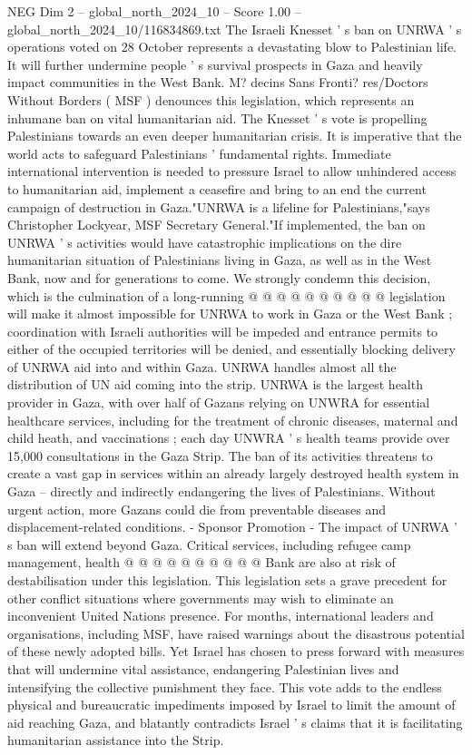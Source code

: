 \begin{textsample}{NEG Dim 2 – global\_north\_2024\_10 – Score 1.00 – global\_north\_2024\_10/116834869.txt}  \label{ex:f2_neg_367}
The Israeli Knesset ' s ban on UNRWA ' s operations voted on 28 October represents a devastating blow to Palestinian life.
It will further undermine people ' s survival prospects in Gaza and heavily impact communities in the West Bank.
M? decins Sans Fronti? res/Doctors Without Borders ( MSF ) denounces this legislation, which represents an inhumane ban on vital humanitarian aid.
The Knesset ' s vote is propelling Palestinians towards an even deeper humanitarian crisis.
It is imperative that the world acts to safeguard Palestinians ' fundamental rights.
Immediate international intervention is needed to pressure Israel to allow unhindered access to humanitarian aid, implement a ceasefire and bring to an end the current campaign of destruction in Gaza."UNRWA is a lifeline for Palestinians,"says Christopher Lockyear, MSF Secretary General."If implemented, the ban on UNRWA ' s activities would have catastrophic implications on the dire humanitarian situation of Palestinians living in Gaza, as well as in the West Bank, now and for generations to come.
We strongly condemn this decision, which is the culmination of a long-running @ @ @ @ @ @ @ @ @ @ legislation will make it almost impossible for UNRWA to work in Gaza or the West Bank ; coordination with Israeli authorities will be impeded and entrance permits to either of the occupied territories will be denied, and essentially blocking delivery of UNRWA aid into and within Gaza.
UNRWA handles almost all the distribution of UN aid coming into the strip.
UNRWA is the largest health provider in Gaza, with over half of Gazans relying on UNWRA for essential healthcare services, including for the treatment of chronic diseases, maternal and child heath, and vaccinations ; each day UNWRA ' s health teams provide over 15,000 consultations in the Gaza Strip.
The ban of its activities threatens to create a vast gap in services within an already largely destroyed health system in Gaza -- directly and indirectly endangering the lives of Palestinians.
Without urgent action, more Gazans could die from preventable diseases and displacement-related conditions. - Sponsor Promotion - The impact of UNRWA ' s ban will extend beyond Gaza.
Critical services, including refugee camp management, health @ @ @ @ @ @ @ @ @ @ Bank are also at risk of destabilisation under this legislation.
This legislation sets a grave precedent for other conflict situations where governments may wish to eliminate an inconvenient United Nations presence.
For months, international leaders and organisations, including MSF, have raised warnings about the disastrous potential of these newly adopted bills.
Yet Israel has chosen to press forward with measures that will undermine vital assistance, endangering Palestinian lives and intensifying the collective punishment they face.
This vote adds to the endless physical and bureaucratic impediments imposed by Israel to limit the amount of aid reaching Gaza, and blatantly contradicts Israel ' s claims that it is facilitating humanitarian assistance into the Strip.

\end{textsample}
